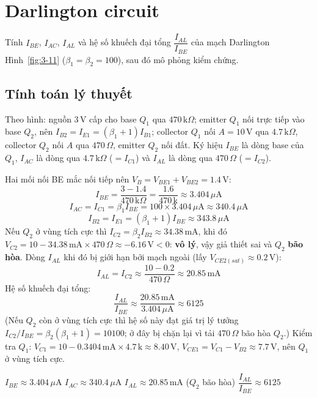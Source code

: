 \section{Darlington circuit}
Tính $I_{BE}$, $I_{AC}$, $I_{AL}$ và hệ số khuếch đại tổng $\dfrac{I_{AL}}{I_{BE}}$ của mạch Darlington Hình~\ref{fig:3-11} ($\beta_1 = \beta_2 = 100$), sau đó mô phỏng kiểm chứng.


\subsection{Tính toán lý thuyết}
Theo hình: nguồn $3\,\text{V}$ cấp cho base $Q_1$ qua $470\,\text{k}\Omega$; emitter $Q_1$ nối trực tiếp vào base $Q_2$, nên $I_{B2} = I_{E1} = (\beta_1+1) I_{B1}$; collector $Q_1$ nối $A = 10\,\text{V}$ qua $4.7\,\text{k}\Omega$, collector $Q_2$ nối $A$ qua $470\,\Omega$, emitter $Q_2$ nối đất. Ký hiệu $I_{BE}$ là dòng base của $Q_1$, $I_{AC}$ là dòng qua $4.7\,\text{k}\Omega$ ($= I_{C1}$) và $I_{AL}$ là dòng qua $470\,\Omega$ ($= I_{C2}$).

Hai mối nối BE mắc nối tiếp nên $V_B = V_{BE1} + V_{BE2} = 1.4\,\text{V}$:
\[ I_{BE} = \frac{3 - 1.4}{470\,\text{k}\Omega} = \frac{1.6}{470\,\text{k}} \approx 3.404\,\mu\text{A} \]
\[ I_{AC} = I_{C1} = \beta_1 I_{BE} = 100\times 3.404\,\mu\text{A} \approx 340.4\,\mu\text{A} \]
\[ I_{B2} = I_{E1} = (\beta_1 + 1) I_{BE} \approx 343.8\,\mu\text{A} \]
Nếu $Q_2$ ở vùng tích cực thì $I_{C2} = \beta_2 I_{B2} \approx 34.38\,\text{mA}$, khi đó $V_{C2} = 10 - 34.38\,\text{mA}\times 470\,\Omega \approx -6.16\,\text{V} < 0$: \textbf{vô lý}, vậy giả thiết sai và $Q_2$ \textbf{bão hòa}. Dòng $I_{AL}$ khi đó bị giới hạn bởi mạch ngoài (lấy $V_{CE2(sat)} \approx 0.2\,\text{V}$):
\[ I_{AL} = I_{C2} \approx \frac{10 - 0.2}{470\,\Omega} \approx 20.85\,\text{mA} \]
Hệ số khuếch đại tổng:
\[ \frac{I_{AL}}{I_{BE}} \approx \frac{20.85\,\text{mA}}{3.404\,\mu\text{A}} \approx 6125 \]
(Nếu $Q_2$ còn ở vùng tích cực thì hệ số này đạt giá trị lý tưởng $I_{C2}/I_{BE} = \beta_2(\beta_1+1) = 10100$; ở đây bị chặn lại vì tải $470\,\Omega$ bão hòa $Q_2$.) Kiểm tra $Q_1$: $V_{C1} = 10 - 0.3404\,\text{mA}\times 4.7\,\text{k} \approx 8.40\,\text{V}$, $V_{CE1} = V_{C1} - V_{B2} \approx 7.7\,\text{V}$, nên $Q_1$ ở vùng tích cực.

\begin{dapsobox}
$I_{BE} \approx 3.404\,\mu\text{A}$ \quad $I_{AC} \approx 340.4\,\mu\text{A}$ \quad $I_{AL} \approx 20.85\,\text{mA}$ ($Q_2$ bão hòa) \quad $\dfrac{I_{AL}}{I_{BE}} \approx 6125$
\end{dapsobox}

